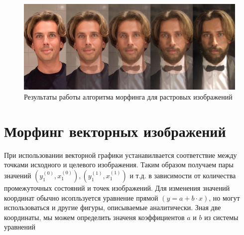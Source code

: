 \documentclass[]{article}
\begin{document}
\begin{figure}[htb]
  \label{galkin}
  \begin{center}
      \includegraphics{../face_morphing/gradient}
  \end{center}
  \caption{Результаты работы алгоритма морфинга для растровых изображений}
\end{figure}

\hypertarget{morf:vec}{%
\section{Морфинг векторных изображений}\label{morf:vec}}

При использовании векторной графики устанавилвается соответствие между точками исходного и целевого изображения. Таким образом получаем пары значений \(\left(y_1^{(0)},x_1^{(0)}\right),\left(y_1^{(1)},x_1^{(1)}\right)\) и т.д. в зависимости от количества промежуточных состояний и точек изображений. Для изменения значений координат обычно исопльзуется уравнение прямой \((y = a + b \cdot x)\), но могут использоваться и другие фигуры, описываемые аналитически. Зная две координаты, мы можем определить значеня коэффициентов \(a\) и \(b\) из системы уравнений

\begin{center}
\end{center}
\end{document}
